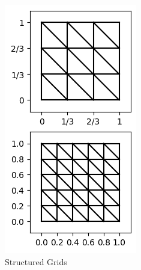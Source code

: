 \documentclass[11pt,a4paper]{article}
\begin{document}
\begin{multicols}{2}
\begin{figure}[H]
  \centering
  \begin{subfigure}{.5\linewidth}
    \centering
    \includegraphics[width=.9\linewidth]{structured_grids}
    \caption{Structured Grids}
  \end{subfigure}%
  \begin{subfigure}{.5\linewidth}
    \centering

\end{subfigure}
\end{figure}
\end{multicols}
\end{document}
